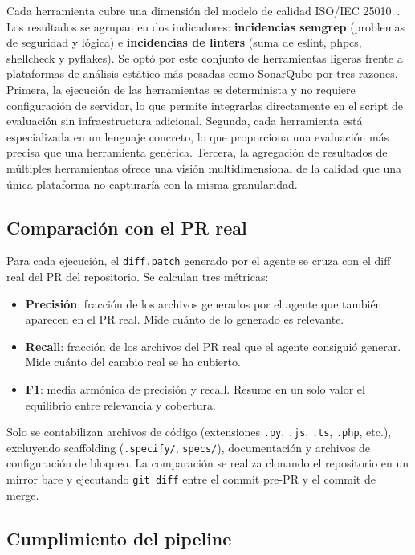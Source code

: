 Cada herramienta cubre una dimensi\'on del modelo de calidad ISO/IEC 25010~\cite{iso25010}. Los resultados se agrupan en dos indicadores: \textbf{incidencias semgrep} (problemas de seguridad y l\'ogica) e \textbf{incidencias de linters} (suma de eslint, phpcs, shellcheck y pyflakes). Se opt\'o por este conjunto de herramientas ligeras frente a plataformas de an\'alisis est\'atico m\'as pesadas como SonarQube por tres razones. Primera, la ejecuci\'on de las herramientas es determinista y no requiere configuraci\'on de servidor, lo que permite integrarlas directamente en el script de evaluaci\'on sin infraestructura adicional. Segunda, cada herramienta est\'a especializada en un lenguaje concreto, lo que proporciona una evaluaci\'on m\'as precisa que una herramienta gen\'erica. Tercera, la agregaci\'on de resultados de m\'ultiples herramientas ofrece una visi\'on multidimensional de la calidad que una \'unica plataforma no capturar\'ia con la misma granularidad.

\subsection{Comparaci\'on con el PR real}

Para cada ejecuci\'on, el \texttt{diff.patch} generado por el agente se cruza con el diff real del PR del repositorio. Se calculan tres m\'etricas:

\begin{itemize}
    \item \textbf{Precisi\'on}: fracci\'on de los archivos generados por el agente que tambi\'en aparecen en el PR real. Mide cu\'anto de lo generado es relevante.
    \item \textbf{Recall}: fracci\'on de los archivos del PR real que el agente consigui\'o generar. Mide cu\'anto del cambio real se ha cubierto.
    \item \textbf{F1}: media arm\'onica de precisi\'on y recall. Resume en un solo valor el equilibrio entre relevancia y cobertura.
\end{itemize}

Solo se contabilizan archivos de c\'odigo (extensiones \texttt{.py}, \texttt{.js}, \texttt{.ts}, \texttt{.php}, etc.), excluyendo scaffolding (\texttt{.specify/}, \texttt{specs/}), documentaci\'on y archivos de configuraci\'on de bloqueo. La comparaci\'on se realiza clonando el repositorio en un mirror bare y ejecutando \texttt{git diff} entre el commit pre-PR y el commit de merge.

\subsection{Cumplimiento del pipeline}

